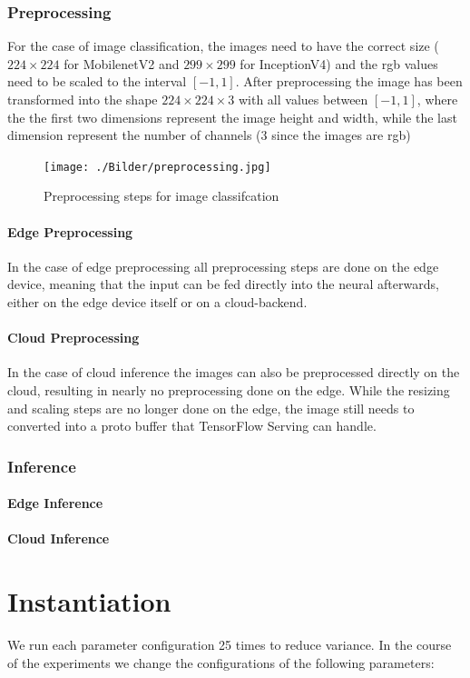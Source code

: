 \subsubsection{Preprocessing}
For the case of image classification, the images need to have the correct size ($224\times224$ for MobilenetV2 and $299\times299$ for InceptionV4) and the rgb values need to be scaled to the interval $[-1,1]$. After preprocessing the image has been transformed into the shape $224\times224\times3$ with all values between $[-1,1]$, where the the first two dimensions represent the image height and width, while the last dimension represent the number of channels (3 since the images are rgb)
\begin{figure}[H]
\centering
\texttt{[image: ./Bilder/preprocessing.jpg]}
\caption{Preprocessing steps for image classifcation}
\label{fig:app}
\end{figure}
\paragraph{Edge Preprocessing}
In the case of edge preprocessing all preprocessing steps are done on the edge device, meaning that the input can be fed directly into the neural afterwards, either on the edge device itself or on a cloud-backend.
\paragraph{Cloud Preprocessing}
In the case of cloud inference the images can also be preprocessed directly on the cloud, resulting in nearly no preprocessing done on the edge. While the resizing and scaling steps are no longer done on the edge, the image still needs to converted into a proto buffer that TensorFlow Serving can handle.
\subsubsection{Inference}
\paragraph{Edge Inference}
\paragraph{Cloud Inference}
\section{Instantiation}
We run each parameter configuration 25 times to reduce variance.
In the course of the experiments we change the configurations of the following parameters:
